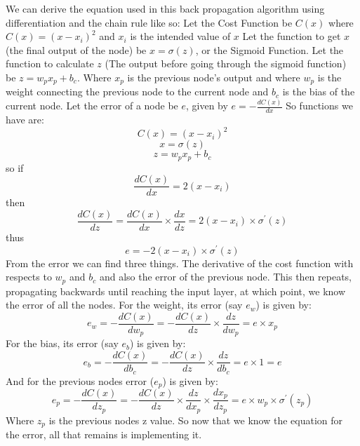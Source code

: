 \documentclass{report}
\begin{document}
\noindent We can derive the equation used in this back propagation algorithm using differentiation and the chain rule like so:
\newline
\newline
Let the Cost Function be $C(x)$ where $C(x) = (x - x_{i})^2$ and $x_{i}$ is the intended value of $x$
\newline
\newline
Let the function to get $x$ (the final output of the node) be $x = \sigma(z)$, or the Sigmoid Function.
\newline
\newline
Let the function to calculate $z$ (The output before going through the sigmoid function) be $z = w_{p}x_{p} + b_{c}$. Where $x_{p}$ is the previous node's output and where $w_{p}$ is the weight connecting the previous node to the current node and $b_{c}$ is the bias of the current node.
\newline
\newline
Let the error of a node be $e$, given by $e = -\frac{d C(x)}{d x} $
So functions we have are:
\newline
$$C(x) = (x - x_{i})^2$$
$$x = \sigma(z)$$
$$z = w_{p}x_{p} + b_{c}$$
so if $$\frac{d C(x)}{d x} = 2(x - x_{i})$$
then $$\frac{d C(x)}{d z} = \frac{d C(x)}{d x} \times \frac{d x}{d z} = 2(x - x_{i}) \times \sigma^{\prime}(z)$$ 
thus $$e = -2(x - x_{i}) \times \sigma^{\prime}(z)$$
From the error we can find three things. The derivative of the cost function with respects to $w_{p}$ and $b_{c}$ and also the error of the previous node. This then repeats, propagating backwards until reaching the input layer, at which point, we know the error of all the nodes.
\newline
For the weight, its error (say $e_{w}$) is given by:
$$e_{w} = -\frac{d C(x)}{d w_{p}} = -\frac{d C(x)}{d z} \times \frac{d z}{d w_{p}} = e \times x_{p}$$
For the bias, its error (say $e_{b}$) is given by:
$$e_{b} = -\frac{d C(x)}{d b_{c}} = -\frac{d C(x)}{d z} \times \frac{d z}{d b_{c}} = e \times 1 = e$$
And for the previous nodes error ($e_{p}$) is given by:
$$e_{p} = -\frac{d C(x)}{d z_{p}} = -\frac{d C(x)}{d z} \times \frac{d z}{d x_{p}} \times \frac{d x_{p}}{d z_{p}} = e \times w_{p} \times \sigma^{\prime}(z_{p})$$
Where $z_{p}$ is the previous nodes z value.
\newline
So now that we know the equation for the error, all that remains is implementing it.
\newpage
\end{document}
